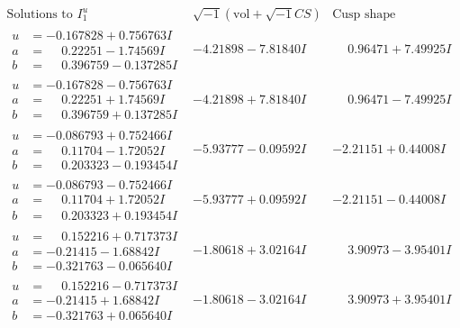 \documentclass[1p]{elsarticle_modified}
\theoremstyle{definition}
\newcommand{\I}{\sqrt{-1}}
\begin{document}
$$\begin{array}{c|c|c}  
\text{Solutions to }I^u_{1}& \I (\text{vol} + \sqrt{-1}CS) & \text{Cusp shape}\\
 \hline 
\begin{aligned}
u &= -0.167828 + 0.756763 I \\
a &= \phantom{-}0.22251 - 1.74569 I \\
b &= \phantom{-}0.396759 - 0.137285 I\end{aligned}
 & -4.21898 - 7.81840 I & \phantom{-}0.96471 + 7.49925 I \\ \hline\begin{aligned}
u &= -0.167828 - 0.756763 I \\
a &= \phantom{-}0.22251 + 1.74569 I \\
b &= \phantom{-}0.396759 + 0.137285 I\end{aligned}
 & -4.21898 + 7.81840 I & \phantom{-}0.96471 - 7.49925 I \\ \hline\begin{aligned}
u &= -0.086793 + 0.752466 I \\
a &= \phantom{-}0.11704 - 1.72052 I \\
b &= \phantom{-}0.203323 - 0.193454 I\end{aligned}
 & -5.93777 - 0.09592 I & -2.21151 + 0.44008 I \\ \hline\begin{aligned}
u &= -0.086793 - 0.752466 I \\
a &= \phantom{-}0.11704 + 1.72052 I \\
b &= \phantom{-}0.203323 + 0.193454 I\end{aligned}
 & -5.93777 + 0.09592 I & -2.21151 - 0.44008 I \\ \hline\begin{aligned}
u &= \phantom{-}0.152216 + 0.717373 I \\
a &= -0.21415 - 1.68842 I \\
b &= -0.321763 - 0.065640 I\end{aligned}
 & -1.80618 + 3.02164 I & \phantom{-}3.90973 - 3.95401 I \\ \hline\begin{aligned}
u &= \phantom{-}0.152216 - 0.717373 I \\
a &= -0.21415 + 1.68842 I \\
b &= -0.321763 + 0.065640 I\end{aligned}
 & -1.80618 - 3.02164 I & \phantom{-}3.90973 + 3.95401 I \\ \hline\begin{aligned}

\end{aligned}
\end{array}$$
\end{document}
